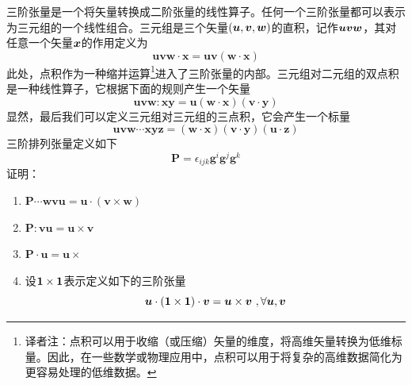 \begin{exercise}
\begin{equation*}
    \end{equation*}
    \item 三阶张量是一个将矢量转换成二阶张量的线性算子。任何一个三阶张量都可以表示为三元组的一个线性组合。三元组是三个矢量$(\bb{u},\bb{v},\bb{w})$的直积，记作$\bb{uvw}$，其对任意一个矢量$\bb{x}$的作用定义为
    \begin{equation*}
        \boldsymbol{uvw}\cdot \boldsymbol{x}=\boldsymbol{uv}\left( \boldsymbol{w}\cdot \boldsymbol{x} \right) 
    \end{equation*}
    此处，点积作为一种缩并运算\footnote{译者注：点积可以用于收缩（或压缩）矢量的维度，将高维矢量转换为低维标量。因此，在一些数学或物理应用中，点积可以用于将复杂的高维数据简化为更容易处理的低维数据。}进入了三阶张量的内部。三元组对二元组的双点积是一种线性算子，它根据下面的规则产生一个矢量
    \begin{equation*}
        \boldsymbol{uvw}:\boldsymbol{xy}=\boldsymbol{u}\left( \boldsymbol{w}\cdot \boldsymbol{x} \right) \left( \boldsymbol{v}\cdot \boldsymbol{y} \right) 
    \end{equation*}
    显然，最后我们可以定义三元组对三元组的三点积，它会产生一个标量
    \begin{equation*}
        \boldsymbol{uvw}\cdots \boldsymbol{xyz}=\left( \boldsymbol{w}\cdot \boldsymbol{x} \right) \left( \boldsymbol{v}\cdot \boldsymbol{y} \right) \left( \boldsymbol{u}\cdot \boldsymbol{z} \right) 
    \end{equation*}
    三阶排列张量定义如下
    \begin{equation*}
        \boldsymbol{P}=\epsilon _{ijk}\boldsymbol{g}^i\boldsymbol{g}^j\boldsymbol{g}^k
    \end{equation*}
    证明：
    \begin{enumerate}
        \item $\boldsymbol{P}\cdots \boldsymbol{wvu}=\boldsymbol{u}\cdot \left( \boldsymbol{v}\times \boldsymbol{w} \right) $
        \item $\boldsymbol{P}:\boldsymbol{vu}=\boldsymbol{u}\times \boldsymbol{v}$
        \item $\boldsymbol{P}\cdot \boldsymbol{u}=\boldsymbol{u}\times $
        \item 设$\bf{1}\times \bf{1}$表示定义如下的三阶张量
        \begin{equation*}
            \boldsymbol{u}\cdot \left( \bf{1}\times \bf{1} \right) \cdot \boldsymbol{v}=\boldsymbol{u}\times \boldsymbol{v}\,\, ,\forall \boldsymbol{u},\boldsymbol{v}
        \end{equation*}

\end{enumerate}
\end{exercise}
